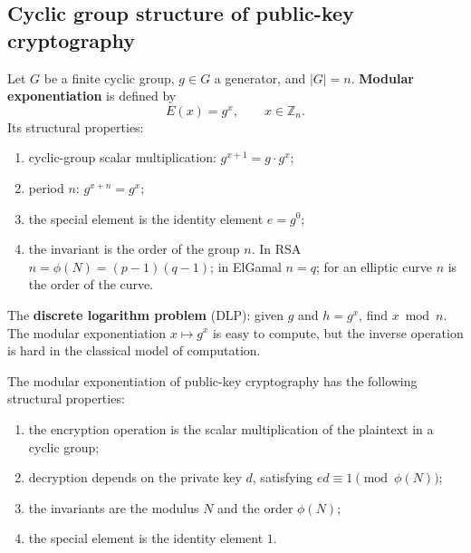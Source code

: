 \subsection{Cyclic group structure of public-key cryptography}

\begin{definition}\label{def:modular_exponentiation_period}
Let \(G\) be a finite cyclic group, \(g\in G\) a generator, and \(|G|=n\). \textbf{Modular exponentiation} is defined by
\[
E(x)=g^x,\qquad x\in\mathbb Z_n.
\]
Its structural properties:
\begin{enumerate}[label=(\roman*)]
    \item cyclic-group scalar multiplication: \(g^{x+1}=g\cdot g^x\);
    \item period \(n\): \(g^{x+n}=g^x\);
    \item the special element is the identity element \(e=g^0\);
    \item the invariant is the order of the group \(n\). In RSA \(n=\phi(N)=(p-1)(q-1)\); in ElGamal \(n=q\); for an elliptic curve \(n\) is the order of the curve.
\end{enumerate}
\end{definition}

\begin{definition}\label{def:discrete_logarithm_problem}
The \textbf{discrete logarithm problem} (DLP): given \(g\) and \(h=g^x\), find \(x\bmod n\). The modular exponentiation \(x\mapsto g^x\) is easy to compute, but the inverse operation is hard in the classical model of computation.
\end{definition}

\begin{proposition}\label{prop:public_key_structure}
The modular exponentiation of public-key cryptography has the following structural properties:
\begin{enumerate}[label=(\roman*)]
    \item the encryption operation is the scalar multiplication of the plaintext in a cyclic group;
    \item decryption depends on the private key \(d\), satisfying \(ed\equiv1\pmod{\phi(N)}\);
    \item the invariants are the modulus \(N\) and the order \(\phi(N)\);
    \item the special element is the identity element \(1\).
\end{enumerate}
\end{proposition}

